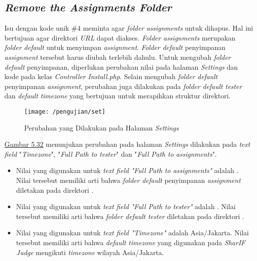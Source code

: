 	\subsection{\textit{Remove the Assignments Folder}}
	Isu dengan kode unik \#4 meminta agar \textit{folder assignments} untuk dihapus. Hal ini bertujuan agar direktori \textit{URL}  dapat diakses. \textit{Folder assignments} merupakan \textit{folder default} untuk menyimpan \textit{assignment}. \textit{Folder default} penyimpanan \textit{assignment} tersebut harus diubah terlebih dahulu. Untuk mengubah \textit{folder default} penyimpanan, diperlukan perubahan nilai pada halaman \textit{Settings} dan kode pada kelas \textit{Controller Install.php}. Selain mengubah \textit{folder default} penyimpanan \textit{assignment}, perubahan juga dilakukan pada \textit{folder default tester} dan \textit{default timezone} yang bertujuan untuk merapihkan struktur direktori.
	\begin{figure}[H]
		\centering  
		\texttt{[image: /pengujian/set]}  
		\caption[Perubahan yang Dilakukan pada Halaman \textit{Settings}]{Perubahan yang Dilakukan pada Halaman \textit{Settings}} 
		\label{fig:set} 
	\end{figure}
	
	\hyperref[fig:set]{Gambar 5.32} menunjukan perubahan pada halaman \textit{Settings} dilakukan pada \textit{text field} "\textit{Timezone}", "\textit{Full Path to tester}" dan "\textit{Full Path to assignments}". 
	\begin{itemize}
		\item Nilai yang digunakan untuk\textit{ text field "Full Path to assignments"} adalah . Nilai tersebut memiliki arti bahwa \textit{folder default} penyimpanan \textit{assignment} diletakan pada direktori .
		\item Nilai yang digunakan untuk \textit{text field "Full Path to tester"} adalah . Nilai tersebut memiliki arti bahwa \textit{folder default tester} diletakan pada direktori .
		\item Nilai yang digunakan untuk \textit{text field "Timezone"} adalah Asia/Jakarta. Nilai tersebut memiliki arti bahwa \textit{default timezone} yang digunakan pada \textit{SharIF Judge} mengikuti \textit{timezone} wilayah Asia/Jakarta.
	\end{itemize}
	
